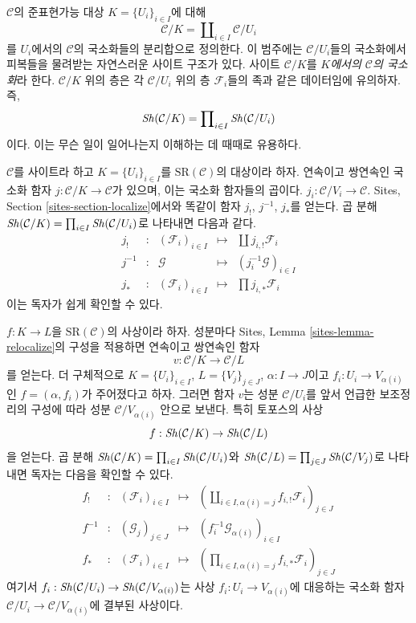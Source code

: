 \medskip\noindent
$\mathcal{C}$의 준표현가능 대상 $K = \{U_i\}_{i \in I}$에 대해
$$
\mathcal{C}/K = \coprod\nolimits_{i \in I} \mathcal{C}/U_i
$$
를 $U_i$에서의 $\mathcal{C}$의 국소화들의 분리합으로 정의한다.
이 범주에는 $\mathcal{C}/U_i$들의 국소화에서 피복들을 물려받는
자연스러운 사이트 구조가 있다.
사이트 $\mathcal{C}/K$를
{\it $K$에서의 $\mathcal{C}$의 국소화}라 한다.
$\mathcal{C}/K$ 위의 층은 각 $\mathcal{C}/U_i$ 위의 층
$\mathcal{F}_i$들의 족과 같은 데이터임에 유의하자. 즉,
$$
\mathop{\mathit{Sh}}\nolimits(\mathcal{C}/K) = \prod\nolimits_{i \in I} \mathop{\mathit{Sh}}\nolimits(\mathcal{C}/U_i)
$$
이다. 이는 무슨 일이 일어나는지 이해하는 데 때때로 유용하다.

\medskip\noindent
$\mathcal{C}$를 사이트라 하고
$K = \{U_i\}_{i \in I}$를 $\text{SR}(\mathcal{C})$의 대상이라 하자.
연속이고 쌍연속인 국소화 함자
$j : \mathcal{C}/K \to \mathcal{C}$가 있으며, 이는 국소화 함자들의
곱이다.
$j_i : \mathcal{C}/V_i \to \mathcal{C}$.
Sites, Section \ref{sites-section-localize}에서와 똑같이
함자 $j_!$, $j^{-1}$, $j_*$를 얻는다.
곱 분해
$\mathop{\mathit{Sh}}\nolimits(\mathcal{C}/K) = \prod\nolimits_{i \in I} \mathop{\mathit{Sh}}\nolimits(\mathcal{C}/U_i)$로
나타내면 다음과 같다.
$$
\begin{matrix}
j_! & : &
(\mathcal{F}_i)_{i \in I} &
\longmapsto &
\coprod j_{i, !}\mathcal{F}_i \\
j^{-1} & : &
\mathcal{G} &
\longmapsto &
(j_i^{-1}\mathcal{G})_{i \in I} \\
j_* & : &
(\mathcal{F}_i)_{i \in I} &
\longmapsto &
\prod j_{i, *}\mathcal{F}_i
\end{matrix}
$$
이는 독자가 쉽게 확인할 수 있다.

\medskip\noindent
$f : K \to L$을 $\text{SR}(\mathcal{C})$의 사상이라 하자.
성분마다 Sites, Lemma \ref{sites-lemma-relocalize}의 구성을 적용하면
연속이고 쌍연속인 함자
$$
v : \mathcal{C}/K \longrightarrow \mathcal{C}/L
$$
를 얻는다. 더 구체적으로 $K = \{U_i\}_{i \in I}$,
$L = \{V_j\}_{j \in J}$, $\alpha : I \to J$이고
$f_i : U_i \to V_{\alpha(i)}$인 $f = (\alpha, f_i)$가 주어졌다고 하자.
그러면 함자 $v$는 성분 $\mathcal{C}/U_i$를 앞서 언급한 보조정리의
구성에 따라 성분 $\mathcal{C}/V_{\alpha(i)}$ 안으로 보낸다.
특히 토포스의 사상
$$
f : \mathop{\mathit{Sh}}\nolimits(\mathcal{C}/K) \to \mathop{\mathit{Sh}}\nolimits(\mathcal{C}/L)
$$
을 얻는다. 곱 분해
$\mathop{\mathit{Sh}}\nolimits(\mathcal{C}/K) = \prod\nolimits_{i \in I} \mathop{\mathit{Sh}}\nolimits(\mathcal{C}/U_i)$와
$\mathop{\mathit{Sh}}\nolimits(\mathcal{C}/L) = \prod\nolimits_{j \in J} \mathop{\mathit{Sh}}\nolimits(\mathcal{C}/V_j)$로
나타내면 독자는 다음을 확인할 수 있다.
$$
\begin{matrix}
f_! & : &
(\mathcal{F}_i)_{i \in I} &
\longmapsto &
(\coprod\nolimits_{i \in I, \alpha(i) = j} f_{i, !}\mathcal{F}_i)_{j \in J} \\
f^{-1} & : &
(\mathcal{G}_j)_{j \in J} &
\longmapsto &
(f_i^{-1}\mathcal{G}_{\alpha(i)})_{i \in I} \\
f_* & : &
(\mathcal{F}_i)_{i \in I} &
\longmapsto &
(\prod\nolimits_{i \in I, \alpha(i) = j} f_{i, *}\mathcal{F}_i)_{j \in J}
\end{matrix}
$$
여기서 $f_i : \mathop{\mathit{Sh}}\nolimits(\mathcal{C}/U_i) \to
\mathop{\mathit{Sh}}\nolimits(\mathcal{C}/V_{\alpha(i)})$는 사상
$f_i : U_i \to V_{\alpha(i)}$에 대응하는 국소화 함자
$\mathcal{C}/U_i \to \mathcal{C}/V_{\alpha(i)}$에 결부된 사상이다.

